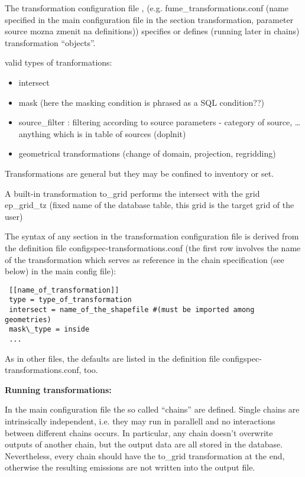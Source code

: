 \documentclass[a4paper,11pt]{article}
\begin{document}
The transformation configuration file , (e.g. fume\_transformations.conf
(name specified in the main configuration file in the section
transformation, parameter source mozna zmenit na definitions)) specifies
or defines (running later in chains) transformation ``objects''.

valid types of tranformations:

\begin{itemize}
\item
  intersect
\item
  mask (here the masking condition is phrased as a SQL condition??)
\item
  source\_filter : filtering according to source parameters - category
  of source, \ldots{} anything which is in table of sources (doplnit)
\item
  geometrical transformations (change of domain, projection, regridding)
\end{itemize}

Transformations are general but they may be confined to inventory or
set.

A built-in transformation to\_grid performs the intersect with the grid
ep\_grid\_tz (fixed name of the database table, this grid is the target
grid of the user)

The syntax of any section in the transformation configuration file is
derived from the definition file configspec-transformations.conf (the
first row involves the name of the transformation which serves as
reference in the chain specification (see below) in the main config
file):

\begin{verbatim}
 [[name_of_transformation]]
 type = type_of_transformation 
 intersect = name_of_the_shapefile #(must be imported among geometries) 
 mask\_type = inside
 ...
\end{verbatim}

As in other files, the defaults are listed in the definition file
configspec-transformations.conf, too.

\textbf{Running transformations:}

In the main configuration file the so called ``chains'' are defined.
Single chains are intrinsically independent, i.e. they may run in
parallell and no interactions between different chains occurs. In
particular, any chain doesn't overwrite outputs of another chain, but
the output data are all stored in the database. Nevertheless, every
chain should have the to\_grid transformation at the end, otherwise the
resulting emissions are not written into the output file.
\end{document}
